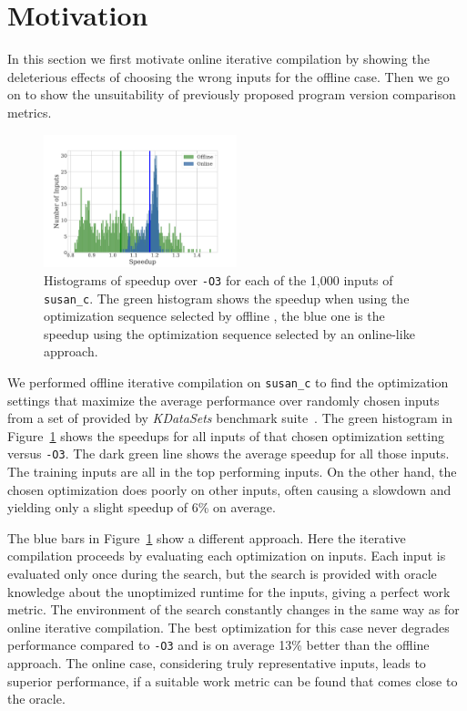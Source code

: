 \section{Motivation}

    In this section we first motivate online iterative compilation by showing the deleterious effects of choosing the wrong inputs for the
    offline case. Then we go on to show the unsuitability of previously proposed program version comparison metrics.

    \begin{figure}[t!]
        \centering
        \includegraphics[width=0.5\textwidth]{figs/motivation-online.pdf}
        \caption{
            Histograms of speedup over \texttt{-O3} for each of the 1,000 inputs of \texttt{susan\_c}. The green histogram shows the
            speedup when using the optimization sequence selected by offline \itercomp, the blue one is the speedup using the optimization
            sequence selected by an online-like approach. 
        }
        \label{fig:motivation-online}
    \end{figure}

    We performed offline iterative compilation on \texttt{susan\_c} to find the optimization settings that maximize the average performance
    over  randomly chosen inputs from a set of  provided by \textit{KDataSets} benchmark
    suite~\cite{chen10,chen12a}. The green histogram in Figure~\ref{fig:motivation-online} shows the speedups for all  inputs
    of that chosen optimization setting versus \texttt{-O3}. The dark green line shows the average speedup for all those inputs. The
     training inputs are all in the top  performing inputs. On the other hand, the chosen optimization does
    poorly on other inputs, often causing a slowdown and yielding only a slight speedup of 6\% on average.
    
    The blue bars in Figure~\ref{fig:motivation-online} show a different approach. Here the iterative compilation proceeds by evaluating
    each optimization on  inputs. Each input is evaluated only once during the search, but the search is provided with oracle
    knowledge about the unoptimized runtime for the inputs, giving a perfect work metric. The environment of the search constantly changes
    in the same way as for online iterative compilation. The best optimization for this case never degrades performance compared to
    \texttt{-O3} and is on average 13\% better than the offline approach. The online case, considering truly representative inputs, leads
    to superior performance, if a suitable work metric can be found that comes close to the oracle.

